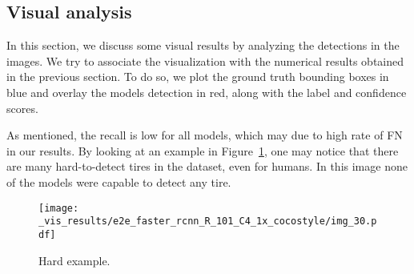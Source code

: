 


\newpage
\subsection{Visual analysis}\label{sec:res_vis}
%
In this section, we discuss some visual results by analyzing the detections in the images.
We try to associate the visualization with the numerical results obtained in the previous section.
To do so, we plot the ground truth bounding boxes in blue and overlay the models detection in red, along with the label and confidence scores.

As mentioned, the recall is low for all models, which may due to high rate of FN in our results.
By looking at an example in Figure~\ref{fig:hard}, one may notice that there are many hard-to-detect tires in the dataset, even for humans.
In this image none of the models were capable to detect any tire.
%
\begin{figure}[h!]
	\centering
	\texttt{[image: \_vis\_results/e2e\_faster\_rcnn\_R\_101\_C4\_1x\_cocostyle/img\_30.pdf]}
	\caption{Hard example.}
	\label{fig:hard}
\end{figure}


